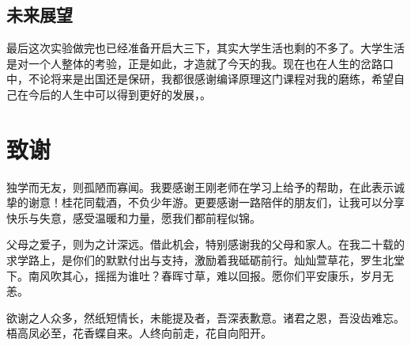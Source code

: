 \documentclass[UTF8,a4paper,10pt]{ctexart}
\begin{document}
\subsection{未来展望}
最后这次实验做完也已经准备开启大三下，其实大学生活也剩的不多了。大学生活是对一个人整体的考验，正是如此，才造就了今天的我。现在也在人生的岔路口中，不论将来是出国还是保研，我都很感谢编译原理这门课程对我的磨练，希望自己在今后的人生中可以得到更好的发展，。

\newpage
\section*{致谢}



独学而无友，则孤陋而寡闻。我要感谢王刚老师在学习上给予的帮助，在此表示诚挚的谢意！桂花同载酒，不负少年游。更要感谢一路陪伴的朋友们，让我可以分享快乐与失意，感受温暖和力量，愿我们都前程似锦。 

父母之爱子，则为之计深远。借此机会，特别感谢我的父母和家人。在我二十载的求学路上，是你们的默默付出与支持，激励着我砥砺前行。灿灿萱草花，罗生北堂下。南风吹其心，摇摇为谁吐？春晖寸草，难以回报。愿你们平安康乐，岁月无恙。 

欲谢之人众多，然纸短情长，未能提及者，吾深表歉意。诸君之恩，吾没齿难忘。梧高凤必至，花香蝶自来。人终向前走，花自向阳开。
% 
%  
\newpage

 
\end{document}
